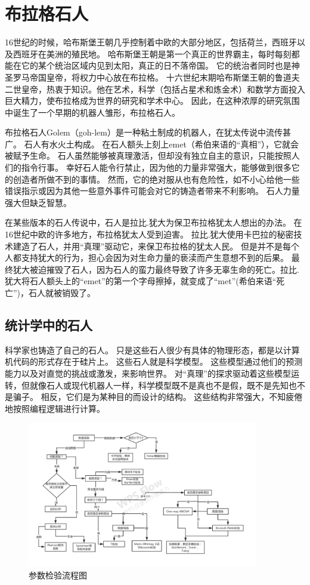 
\chapter{布拉格石人}
16世纪的时候，哈布斯堡王朝几乎控制着中欧的大部分地区，包括荷兰，西班牙以及西班牙在美洲的殖民地。
哈布斯堡王朝是第一个真正的世界霸主，每时每刻都能在它的某个统治区域内见到太阳，真正的日不落帝国。
它的统治者同时也是神圣罗马帝国皇帝，将权力中心放在布拉格。
十六世纪末期哈布斯堡王朝的鲁道夫二世皇帝，热衷于知识。他在艺术，科学（包括占星术和炼金术）和数学方面投入巨大精力，使布拉格成为世界的研究和学术中心。
因此，在这种浓厚的研究氛围中诞生了一个早期的机器人雏形，布拉格石人。

布拉格石人Golem（goh-lem）是一种粘土制成的机器人，在犹太传说中流传甚广。
石人有水火土构成。
在石人额头上刻上emet（希伯来语的“真相”），它就会被赋予生命。
石人虽然能够被真理激活，但却没有独立自主的意识，只能按照人们的指令行事。
幸好石人能令行禁止，因为他的力量非常强大，能够做到很多它的创造者所做不到的事情。
然而，它的绝对服从也有危险性，如不小心给他一些错误指示或因为其他一些意外事件可能会对它的铸造者带来不利影响。
石人力量强大但缺乏智慧。


在某些版本的石人传说中，石人是拉比.犹大为保卫布拉格犹太人想出的办法。
在16世纪中欧的许多地方，布拉格犹太人受到迫害。
拉比.犹大使用卡巴拉的秘密技术建造了石人，并用“真理”驱动它，来保卫布拉格的犹太人民。
但是并不是每个人都支持犹大的行为，担心会因为对生命力量的亵渎而产生意想不到的后果。
最终犹大被迫摧毁了石人，因为石人的蛮力最终导致了许多无辜生命的死亡。拉比.犹大将石人额头上的“emet”的第一个字母擦掉，就变成了“met”(希伯来语“死亡”)，石人就被销毁了。

\section{统计学中的石人}
科学家也铸造了自己的石人。
只是这些石人很少有具体的物理形态，都是以计算机代码的形式存在于硅片上。
这些石人就是科学模型。
这些模型通过他们的预测能力以及对直觉的挑战或激发，来影响世界。
对“真理”的探求驱动着这些模型运转，但就像石人或现代机器人一样，科学模型既不是真也不是假，既不是先知也不是骗子。 
相反，它们是为某种目的而设计的结构。 这些结构非常强大，不知疲倦地按照编程逻辑进行计算。

\begin{figure}[htbp]
  \centering
 \includegraphics[width=0.9\textwidth]{chapters/figures/f1-1.png} 
 \caption{参数检验流程图}
\end{figure}

